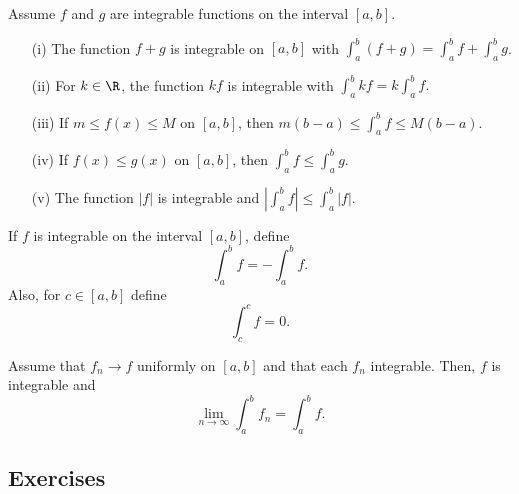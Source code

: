 \begin{tcolorbox}
\begin{thm}
	Assume \( f  \) and \( g  \)  are integrable functions on the interval \( [a,b]  \).
	\begin{enumerate}
		\item[(i)] The function \( f + g  \) is integrable on \( [a,b]  \) with \( \int_{ a }^{ b } (f + g) = \int_{ a }^{ b }  f + \int_{ a }^{ b } g  \).
		\item[(ii)] For \( k \in \R  \), the function \( kf  \) is integrable with \( \int_{ a }^{ b } kf  = k \int_{ a }^{ b }  f. \)
		\item[(iii)] If \( m \leq f(x) \leq M  \) on \( [a,b]  \), then \( m(b-a) \leq \int_{ a }^{ b } f \leq M(b-a) \).
		\item[(iv)] If \( f(x) \leq g(x)  \) on \( [a,b]  \), then \( \int_{ a }^{ b } f  \leq \int_{ a }^{ b } g  \).
		\item[(v)] The function \( | f |   \) is integrable and \( | \int_{ a }^{ b }  f | \leq \int_{ a }^{ b } | f |. \) 
	\end{enumerate}
\end{thm}
\end{tcolorbox}



\begin{tcolorbox}
\begin{defn}
	If \( f  \) is integrable on the interval \( [a,b]  \), define 
	\[  \int_{ a }^{ b } f = - \int_{ a }^{b  } f. \]
	Also, for \( c \in [a,b]  \) define 
	\[  \int_{ c }^{ c } f = 0. \]
\end{defn}
\end{tcolorbox}


\begin{tcolorbox}
	\begin{thm}
	Assume that \( f_{n} \to f  \) uniformly on \( [a,b]  \) and that each \( f_{n}  \) integrable. Then, \( f \) is integrable and 
	\[  \lim_{ n \to \infty  }  \int_{ a }^{ b } f_{n} = \int_{ a }^{ b } f. \]
	\end{thm}
\end{tcolorbox}



\subsection{Exercises}





